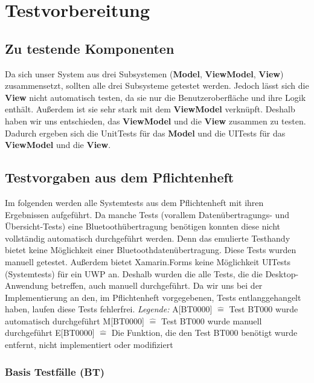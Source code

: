 \documentclass[a4paper]{scrreprt}
\begin{document}
\chapter{Testvorbereitung}
\section{Zu testende Komponenten}
Da sich unser System aus drei Subsystemen (\textbf{Model}, \textbf{ViewModel}, \textbf{View}) zusammensetzt, sollten alle drei Subsysteme getestet werden. Jedoch lässt sich die \textbf{View} nicht automatisch testen, da sie nur die Benutzeroberfläche und ihre Logik enthält. Außerdem ist sie sehr stark mit dem \textbf{ViewModel} verknüpft. Deshalb haben wir uns entschieden, das \textbf{ViewModel} und die \textbf{View} zusammen zu testen. Dadurch ergeben sich die UnitTests für das \textbf{Model} und die UITests für das \textbf{ViewModel} und die \textbf{View}.

\section{Testvorgaben aus dem Pflichtenheft}
Im folgenden werden alle Systemtests aus dem Pflichtenheft mit ihren Ergebnissen aufgeführt. Da manche Tests (vorallem Datenübertragungs- und Übersicht-Tests) eine Bluetoothübertragung benötigen konnten diese nicht vollständig automatisch durchgeführt werden. Denn das emulierte Testhandy bietet keine Möglichkeit einer Bluetoothdatenübertragung. Diese Tests wurden manuell getestet. Außerdem bietet Xamarin.Forms keine Möglichkeit UITests (Systemtests) für ein UWP an. Deshalb wurden die alle Tests, die die Desktop-Anwendung betreffen, auch manuell durchgeführt. Da wir uns bei der Implementierung an den, im Pflichtenheft vorgegebenen, Tests entlanggehangelt haben, laufen diese Tests fehlerfrei.\newline \newline
\textit{Legende:} \newline
A[BT0000]  $\widehat{=}$ Test \dq{}BT000\dq{} wurde automatisch durchgeführt \newline
M[BT0000]  $\widehat{=}$ Test \dq{}BT000\dq{} wurde manuell durchgeführt \newline
E[BT0000]  $\widehat{=}$ Die Funktion, die den Test \dq{}BT000\dq{} benötigt wurde entfernt, nicht implementiert oder modifiziert
\subsection{Basis Testfälle (BT)}
\end{document}
